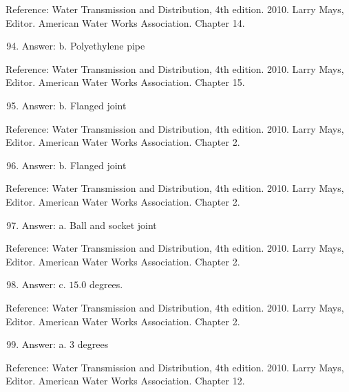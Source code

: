 \documentclass[10pt]{article}
\begin{document}
Reference: Water Transmission and Distribution, 4th edition. 2010. Larry Mays, Editor. American Water Works Association. Chapter 14.

\begin{enumerate}
  \setcounter{enumi}{93}
  \item Answer: b. Polyethylene pipe
\end{enumerate}

Reference: Water Transmission and Distribution, 4th edition. 2010. Larry Mays, Editor. American Water Works Association. Chapter 15.

\begin{enumerate}
  \setcounter{enumi}{94}
  \item Answer: b. Flanged joint
\end{enumerate}

Reference: Water Transmission and Distribution, 4th edition. 2010. Larry Mays, Editor. American Water Works Association. Chapter 2.

\begin{enumerate}
  \setcounter{enumi}{95}
  \item Answer: b. Flanged joint
\end{enumerate}

Reference: Water Transmission and Distribution, 4th edition. 2010. Larry Mays, Editor. American Water Works Association. Chapter 2.

\begin{enumerate}
  \setcounter{enumi}{96}
  \item Answer: a. Ball and socket joint
\end{enumerate}

Reference: Water Transmission and Distribution, 4th edition. 2010. Larry Mays, Editor. American Water Works Association. Chapter 2.

\begin{enumerate}
  \setcounter{enumi}{97}
  \item Answer: c. $15.0$ degrees.
\end{enumerate}

Reference: Water Transmission and Distribution, 4th edition. 2010. Larry Mays, Editor. American Water Works Association. Chapter 2.

\begin{enumerate}
  \setcounter{enumi}{98}
  \item Answer: a. 3 degrees
\end{enumerate}

Reference: Water Transmission and Distribution, 4th edition. 2010. Larry Mays, Editor. American Water Works Association. Chapter 12.
\end{document}
